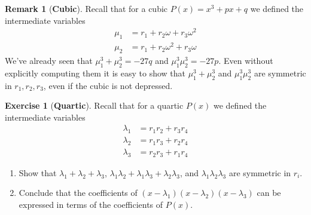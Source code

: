 \documentclass[reqno, 12pt, letter]{article}
\theoremstyle{plain}
\theoremstyle{definition}
\newtheorem{remark}[theorem]{Remark}
\newtheorem{exercise}[theorem]{Exercise}
\theoremstyle{remark}
\numberwithin{equation}{section}
\begin{document}
	\begin{remark}[\textbf{Cubic}] Recall that for a cubic $ P(x)=x^3 + px + q$ we defined the intermediate variables \begin{align*}
    \mu_1 &= r_1 + r_2 \omega + r_3 \omega^2 \\
    \mu_2 &= r_1 + r_2 \omega^2 + r_3 \omega
  \end{align*}
	We've already seen that $ \mu_1^3 + \mu_2^3 = -27q$ and $ \mu_1^3 \mu_2^3 = -27p$. Even without explicitly computing them it is easy to show that $ \mu_1^3 + \mu_2^3$ and $\mu_1^3  \mu_2^3$ are symmetric in $ r_1, r_2, r_3$, even if the cubic is not depressed.
	\end{remark}
	
	\begin{exercise}[\textbf{Quartic}]
		\label{exercise:quartic-lambda}
		Recall that for a quartic $ P(x)$ we defined the intermediate variables
		\begin{align*}
				\lambda_1 &= r_1 r_2 + r_3 r_4 \\
				\lambda_2 &= r_1 r_3 + r_2 r_4 \\
				\lambda_3 &= r_2 r_3 + r_1 r_4 
		\end{align*}
			\begin{enumerate}
			\item Show that $ \lambda_1 + \lambda_2 + \lambda_3$, $ \lambda_1 \lambda_2 + \lambda_1 \lambda_3 + \lambda_2 \lambda_3$, and $ \lambda_1 \lambda_2 \lambda_3$ are symmetric in $r_i$. 
			\item Conclude that the coefficients of $ (x-\lambda_1)(x-\lambda_2)(x-\lambda_3)$ can be expressed in terms of the coefficients of $ P(x)$.
		\end{enumerate}
	\end{exercise}
	
\end{document}
